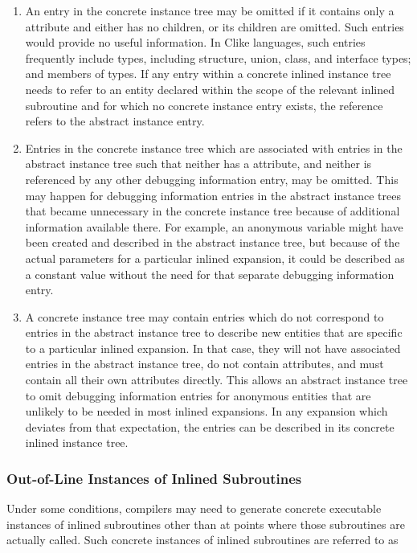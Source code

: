 \begin{enumerate}[1. ]
\item An entry in the concrete instance tree may be omitted if
it contains only a
\DWATabstractorigin{} attribute and either
has no children, or its children are omitted. Such entries
would provide no useful information. In C\dash like languages,
such entries frequently include types, including structure,
union, class, and interface types; and members of types. If any
entry within a concrete inlined instance tree needs to refer
to an entity declared within the scope of the relevant inlined
subroutine and for which no concrete instance entry exists,
the reference refers to the abstract instance entry.

\item Entries in the concrete instance tree which are associated
with entries in the abstract instance tree such that neither
has a \DWATname{} attribute,
and neither is referenced by
any other debugging information entry, may be omitted. This
may happen for debugging information entries in the abstract
instance trees that became unnecessary in the concrete instance
tree because of additional information available there. For
example, an anonymous variable might have been created and
described in the abstract instance tree, but because of
the actual parameters for a particular inlined expansion,
it could be described as a constant value without the need
for that separate debugging information entry.

\item A concrete instance tree may contain entries which do
not correspond to entries in the abstract instance tree
to describe new entities that are specific to a particular
inlined expansion. In that case, they will not have associated
entries in the abstract instance tree, do not contain
\DWATabstractorigin{} attributes, and must contain all their
own attributes directly. This allows an abstract instance tree
to omit debugging information entries for anonymous entities
that are unlikely to be needed in most inlined expansions. In
any expansion which deviates from that expectation, the
entries can be described in its concrete inlined instance tree.

\end{enumerate}

\subsubsection{Out-of-Line Instances of Inlined Subroutines}
\label{chap:outoflineinstancesofinlinedsubroutines}
Under some conditions, compilers may need to generate concrete
executable instances of inlined subroutines other than at
points where those subroutines are actually called. Such
concrete instances of inlined subroutines are referred to as

